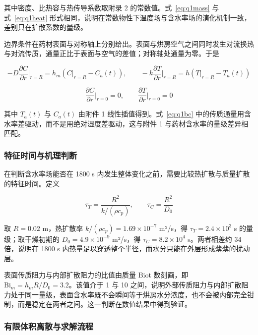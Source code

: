 \documentclass[12pt,a4paper]{article}
\begin{document}
其中密度、比热容与热传导系数取附录 2 的常数值。式~\eqref{eq:q1mass} 与式~\eqref{eq:q1heat} 形式相同，说明在常数物性下温度场与含水率场的演化机制一致，差别只在扩散系数的量级。

边界条件在药材表面与对称轴上分别给出。表面与烘房空气之间同时发生对流换热与对流传质，通量正比于表面与空气的差值；对称轴处通量为零。于是

\begin{equation}
-D\frac{\partial C}{\partial r}\bigg|_{r=R}=h_m\left(C\big|_{r=R}-C_a(t)\right),\qquad
-k\frac{\partial T}{\partial r}\bigg|_{r=R}=h\left(T\big|_{r=R}-T_a(t)\right)
\label{eq:q1bc}
\end{equation}

\begin{equation}
\frac{\partial C}{\partial r}\bigg|_{r=0}=0,\qquad
\frac{\partial T}{\partial r}\bigg|_{r=0}=0
\label{eq:q1sym}
\end{equation}

其中 $T_a(t)$ 与 $C_a(t)$ 由附件 1 线性插值得到。式~\eqref{eq:q1bc} 中的传质通量用含水率差驱动，而不是用绝对湿度差驱动，这与附件 1 与药材含水率的量级差异相匹配。

\subsubsection{特征时间与机理判断}

在判断含水率场能否在 1800 s 内发生整体变化之前，需要比较热扩散与质量扩散的特征时间。定义

\begin{equation}
\tau_T=\frac{R^2}{k/(\rho c_p)},\qquad
\tau_C=\frac{R^2}{D_0}
\label{eq:q1tau}
\end{equation}

取 $R=0.02$ m，热扩散率 $k/(\rho c_p)=1.69\times10^{-7}$ m²/s，得 $\tau_T=2.4\times10^{3}$ s 的量级；取干燥初期的 $D_0=4.9\times10^{-9}$ m²/s，得 $\tau_C=8.2\times10^{4}$ s。两者相差约 34 倍，说明在 1800 s 内热量足以穿透整个半径，而水分只能在外层形成薄薄的扰动层。

表面传质阻力与内部扩散阻力的比值由质量 Biot 数刻画，即 $\mathrm{Bi}_m=h_mR/D_0=3.2$。该值介于 1 与 10 之间，说明外部传质阻力与内部扩散阻力处于同一量级，表面含水率既不会瞬间等于烘房水分浓度，也不会被内部完全钳制，而是稳定在两者之间。这一判断在数值结果中得到验证。

\subsubsection{有限体积离散与求解流程}
\end{document}
